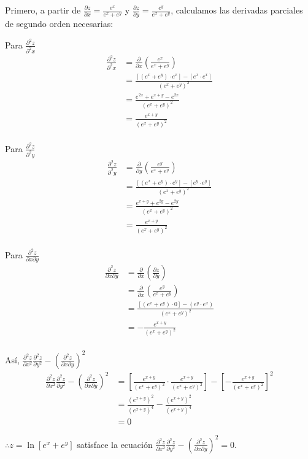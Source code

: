 \documentclass[12pt]{article}
\begin{document}
\begin{itemize}[format=\textbf]
  Primero, a partir de $\frac{\partial z}{\partial x}=\frac{e^x}{e^x+e^y}$ y $\frac{\partial z}{\partial y}=\frac{e^y}{e^x+e^y}$, calculamos las derivadas parciales de segundo orden necesarias:

  Para $\frac{\partial^2 z}{\partial^2 x}$
  \begin{align*}
    \frac{\partial^2 z}{\partial^2 x}
    &= \frac{\partial}{\partial x} \left( \frac{e^x}{e^x+e^y} \right)\\
    &= \frac{[(e^x+e^y)\cdot e^x]-[e^x \cdot e^x]}{(e^x+e^y)^2} \\
    &= \frac{e^{2x}+e^{x+y}-e^{2x}}{(e^x+e^y)^2}\\
    &= \frac{e^{x+y}}{(e^x+e^y)^2}\\
  \end{align*}

  Para $\frac{\partial^2 z}{\partial^2 y}$
  \begin{align*}
    \frac{\partial^2 z}{\partial^2 y}
    &= \frac{\partial}{\partial y} \left( \frac{e^y}{e^x+e^y} \right)\\
    &= \frac{[(e^x+e^y)\cdot e^y]-[e^y \cdot e^y]}{(e^x+e^y)^2} \\
    &= \frac{e^{x+y}+e^{2y}-e^{2y}}{(e^x+e^y)^2}\\
    &= \frac{e^{x+y}}{(e^x+e^y)^2}\\
  \end{align*}

  Para $\frac{\partial^2 z}{\partial x \partial y}$
  \begin{align*}
    \frac{\partial^2 z}{\partial x \partial y}
    &= \frac{\partial}{\partial x} \left( \frac{\partial z}{\partial y} \right) \\
    &= \frac{\partial}{\partial x} \left( \frac{e^y}{e^x+e^y} \right) \\
    &= \frac{[(e^x+e^y)\cdot 0] - (e^y \cdot e^x)}{(e^x+e^y)^2} \\
    &= - \frac{e^{x+y}}{(e^x+e^y)^2}\\
  \end{align*}

  Así, $\frac{\partial^2 z}{\partial x^2} \frac{\partial^2 z}{\partial y^2} - \left( \frac{\partial^2 z}{\partial x \partial y} \right)^2$
  \begin{align*}
    \frac{\partial^2 z}{\partial x^2} \frac{\partial^2 z}{\partial y^2} - \left( \frac{\partial^2 z}{\partial x \partial y} \right)^2
    &= \left[ \frac{e^{x+y}}{(e^x+e^y)^2}\cdot \frac{e^{x+y}}{(e^x+e^y)^2} \right] - \left[- \frac{e^{x+y}}{(e^x+e^y)^2}\right]^2 \\
    &= \frac{(e^{x+y})^2}{(e^{x+y})^4} - \frac{(e^{x+y})^2}{(e^{x+y})^4} \\
    &= 0
  \end{align*}

  $\therefore z = \ln{[e^x + e^y]}$ satisface la ecuación $\frac{\partial^2 z}{\partial x^2} \frac{\partial^2 z}{\partial y^2} - \left( \frac{\partial^2 z}{\partial x \partial y} \right)^2=0$.

\end{itemize}
\end{document}
